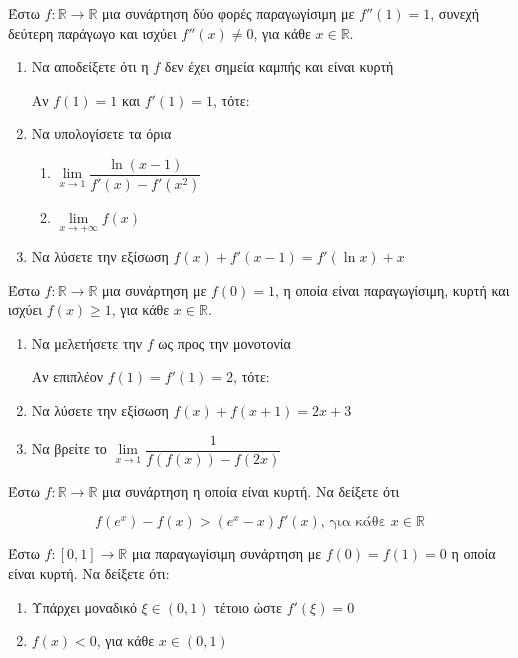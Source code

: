 \documentclass{presentation}
\begin{document}
\begin{askisi}
  Έστω $f:\mathbb{R}\to\mathbb{R}$ μια συνάρτηση δύο φορές παραγωγίσιμη με $f''(1)=1$, συνεχή δεύτερη παράγωγο και ισχύει $f''(x)\ne 0$, για κάθε $x\in\mathbb{R}$.
  \begin{enumerate}[<+->]
    \item Να αποδείξετε ότι η $f$ δεν έχει σημεία καμπής και είναι κυρτή

          Αν $f(1)=1$ και $f'(1)=1$, τότε:

    \item Να υπολογίσετε τα όρια
          \begin{enumerate}[<+->]
            \item $\lim\limits_{x\to 1}\dfrac{\ln(x-1)}{f'(x)-f'(x^2)}$
            \item $\lim\limits_{x\to +\infty}f(x)$
          \end{enumerate}

    \item Να λύσετε την εξίσωση $f(x)+f'(x-1)=f'(\ln x)+x$
  \end{enumerate}
\end{askisi}

\begin{askisi}
  Έστω $f:\mathbb{R}\to\mathbb{R}$ μια συνάρτηση με $f(0)=1$, η οποία είναι παραγωγίσιμη, κυρτή και ισχύει $f(x)\ge 1$, για κάθε $x\in\mathbb{R}$.
  \begin{enumerate}[<+->]
    \item Να μελετήσετε την $f$ ως προς την μονοτονία

          Αν επιπλέον $f(1)=f'(1)=2$, τότε:

    \item Να λύσετε την εξίσωση $f(x)+f(x+1)=2x+3$
    \item Να βρείτε το $\lim\limits_{x\to 1}\dfrac{1}{f\left( f(x)\right)-f(2x)}$
  \end{enumerate}
\end{askisi}

\begin{askisi}
  Έστω $f:\mathbb{R}\to\mathbb{R}$ μια συνάρτηση η οποία είναι κυρτή. Να δείξετε ότι

  $$f(e^x)-f(x)>(e^x-x)f'(x) \text{, για κάθε } x\in\mathbb{R}$$
\end{askisi}

\begin{askisi}
  Έστω $f:[0,1]\to\mathbb{R}$ μια παραγωγίσιμη συνάρτηση με $f(0)=f(1)=0$ η οποία είναι κυρτή. Να δείξετε ότι:
  \begin{enumerate}[<+->]
    \item Υπάρχει μοναδικό $ξ\in(0,1)$ τέτοιο ώστε $f'(ξ)=0$
    \item $f(x)<0$, για κάθε $x\in(0,1)$
  \end{enumerate}
\end{askisi}
\end{document}
